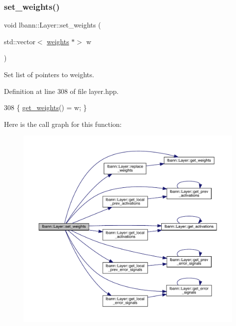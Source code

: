\subsubsection{\texorpdfstring{set\+\_\+weights()}{set\_weights()}}
{\footnotesize\ttfamily void lbann\+::\+Layer\+::set\+\_\+weights (\begin{DoxyParamCaption}\item[{std\+::vector$<$ \hyperlink{classlbann_1_1weights}{weights} $\ast$$>$}]{w }\end{DoxyParamCaption})\hspace{0.3cm}{\ttfamily [inline]}}

Set list of pointers to weights. 

Definition at line 308 of file layer.\+hpp.


\begin{DoxyCode}
308 \{ \hyperlink{classlbann_1_1Layer_a4ee78d42284421519dd18d27b4da0957}{get\_weights}() = w; \}
\end{DoxyCode}
Here is the call graph for this function\+:\nopagebreak
\begin{figure}[H]
\begin{center}
\leavevmode
\includegraphics[width=350pt]{classlbann_1_1Layer_a524a78dc6a812ae92834a9e1aa83434b_cgraph}
\end{center}
\end{figure}
\mbox{\label{classlbann_1_1Layer_a93d6048c5959b27aa475673568dab956}} 
